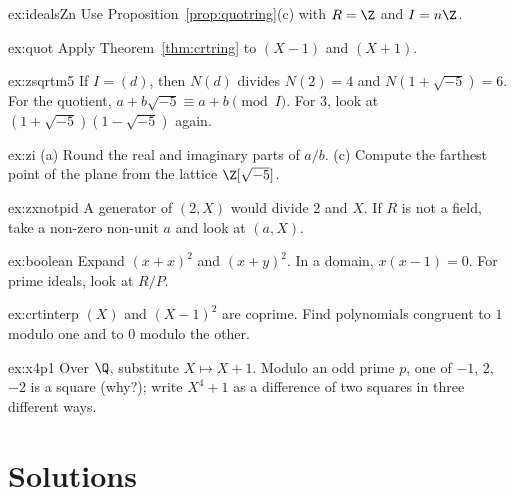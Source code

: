 \begin{hint}{ex:idealsZn}
Use Proposition~\ref{prop:quotring}(c) with $R=\Z$ and $I=n\Z$.
\end{hint}
\begin{hint}{ex:quot}
Apply Theorem~\ref{thm:crtring} to $(X-1)$ and $(X+1)$.
\end{hint}
\begin{hint}{ex:zsqrtm5}
If $I=(d)$, then $N(d)$ divides $N(2)=4$ and $N(1+\sqrt{-5})=6$. For the quotient, $a+b\sqrt{-5}\equiv a+b\pmod I$. For $3$, look at $(1+\sqrt{-5})(1-\sqrt{-5})$ again.
\end{hint}
\begin{hint}{ex:zi}
(a) Round the real and imaginary parts of $a/b$. (c) Compute the farthest point of the plane from the lattice $\Z[\sqrt{-5}]$.
\end{hint}
\begin{hint}{ex:zxnotpid}
A generator of $(2,X)$ would divide $2$ and $X$. If $R$ is not a field, take a non-zero non-unit $a$ and look at $(a,X)$.
\end{hint}
\begin{hint}{ex:boolean}
Expand $(x+x)^2$ and $(x+y)^2$. In a domain, $x(x-1)=0$. For prime ideals, look at $R/P$.
\end{hint}
\begin{hint}{ex:crtinterp}
$(X)$ and $(X-1)^2$ are coprime. Find polynomials congruent to $1$ modulo one and to $0$ modulo the other.
\end{hint}
\begin{hint}{ex:x4p1}
Over $\Q$, substitute $X\mapsto X+1$. Modulo an odd prime $p$, one of $-1$, $2$, $-2$ is a square (why?); write $X^4+1$ as a difference of two squares in three different ways.
\end{hint}

\section{Solutions}

